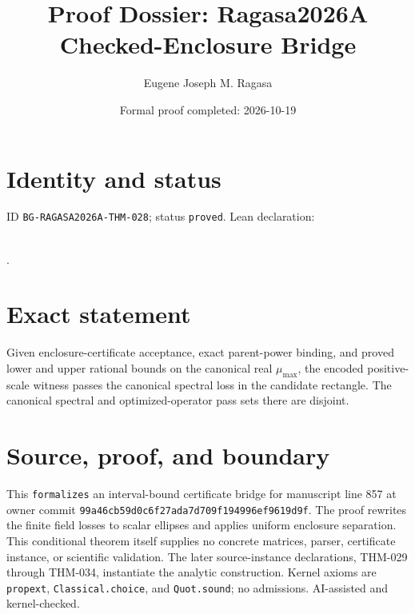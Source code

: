 \documentclass[11pt]{article}
\title{Proof Dossier: Ragasa2026A Checked-Enclosure Bridge}\author{Eugene Joseph M. Ragasa}\date{Formal proof completed: 2026-10-19}
\begin{document}
\maketitle
\section{Identity and status}
ID \texttt{BG-RAGASA2026A-THM-028}; status \texttt{proved}. Lean declaration:
\par{}\\
{\tiny{}}.
\section{Exact statement}
Given enclosure-certificate acceptance, exact parent-power binding, and proved lower and
upper rational bounds on the canonical real $\mu_{\max}$, the encoded positive-scale
witness passes the canonical spectral loss in the candidate rectangle. The canonical
spectral and optimized-operator pass sets there are disjoint.
\section{Source, proof, and boundary}
This \texttt{formalizes} an interval-bound certificate bridge for manuscript line 857 at
owner commit \texttt{99a46cb59d0c6f27ada7d709f194996ef9619d9f}. The proof rewrites
the finite field losses to scalar ellipses and applies uniform enclosure separation. This
conditional theorem itself supplies no concrete matrices, parser, certificate instance, or
scientific validation. The later source-instance declarations, THM-029 through THM-034,
instantiate the analytic construction.
Kernel axioms are \texttt{propext}, \texttt{Classical.choice}, and
\texttt{Quot.sound}; no admissions. AI-assisted and kernel-checked.
\end{document}
